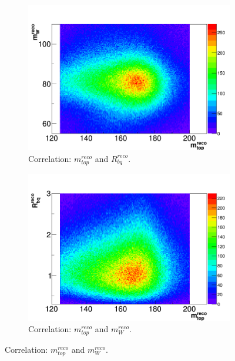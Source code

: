 \begin{figure} [h]%
	\centering
	

	\begin{subfigure}{0.4\textwidth}
		\includegraphics[width=\linewidth]{Pics/PlotCombi/mtopmw.png}
		\caption{Correlation: $m_{top}^{reco}$ and $R_{bq}^{reco}$.} \label{fig:1a}
	\end{subfigure}
	\hspace*{0.1cm}
	\begin{subfigure}{0.4\textwidth}
	\includegraphics[width=\linewidth]{Pics/PlotCombi/mtopRbq.png}
	\caption{Correlation:  $m_{top}^{reco}$ and $m_{W}^{reco}$.} \label{fig:1b}
	\end{subfigure}


\end{figure}
